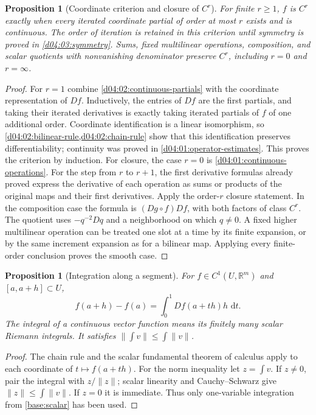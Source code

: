 \documentclass[11pt,oneside,openany]{book}
\newtheorem{proposition}[theorem]{Proposition}
\theoremstyle{definition}
\theoremstyle{remark}
\newcommand{\R}{\mathbb R}
\newcommand{\norm}[1]{\lVert#1\rVert}
\newcommand{\dd}{\,\mathrm d}
\begin{document}
\begin{proposition}[Coordinate criterion and closure of $C^r$]\label{d04:02:cr-calculus}
For finite $r\geq1$, $f$ is $C^r$ exactly when every iterated coordinate
partial of order at most $r$ exists and is continuous. The order of iteration
is retained in this criterion until symmetry is proved in
\cref{d04:03:symmetry}. Sums, fixed multilinear operations, composition,
and scalar quotients with nonvanishing denominator preserve $C^r$,
including $r=0$ and $r=\infty$.
\end{proposition}
\begin{proof}
For $r=1$ combine \cref{d04:02:continuous-partials} with the coordinate
representation of $Df$. Inductively, the entries of $Df$ are the first
partials, and taking their iterated derivatives is exactly taking iterated
partials of $f$ of one additional order. Coordinate identification is a
linear isomorphism, so \cref{d04:02:bilinear-rule,d04:02:chain-rule} show
that this identification preserves differentiability; continuity was proved
in \cref{d04:01:operator-estimates}. This proves the criterion by induction.
For closure, the case $r=0$ is
\cref{d04:01:continuous-operations}. For the step from $r$ to $r+1$, the
first derivative formulas already proved express the derivative of each
operation as sums or products of the original maps and their first
derivatives. Apply the order-$r$ closure statement. In the composition case
the formula is $(Dg\circ f)Df$, with both factors of class $C^r$.
The quotient uses $-q^{-2}Dq$ and a neighborhood on which $q\ne0$.
A fixed higher multilinear operation can be treated one slot at a time by
its finite expansion, or by the same increment expansion as for a bilinear
map. Applying every finite-order conclusion proves the smooth case.
\end{proof}

\begin{proposition}[Integration along a segment]\label{d04:02:segment-ftc}
For $f\in C^1(U,\R^m)$ and $[a,a+h]\subset U$,
\[
 f(a+h)-f(a)=\int_0^1Df(a+th)h\,\dd t.
\]
The integral of a continuous vector function means its finitely many scalar
Riemann integrals. It satisfies
$\norm{\int v}\leq\int\norm{v}$.
\end{proposition}
\begin{proof}
The chain rule and the scalar fundamental theorem of calculus apply to each
coordinate of $t\mapsto f(a+th)$. For the norm inequality let $z=\int v$.
If $z\ne0$, pair the integral with $z/\norm{z}$; scalar linearity and
Cauchy--Schwarz give $\norm{z}\leq\int\norm{v}$. If $z=0$ it is immediate.
Thus only one-variable integration from \cref{base:scalar} has been used.
\end{proof}
\end{document}
